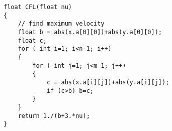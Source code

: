\documentclass[notitlepage]{article}
\begin{document}
\begin{lstlisting}[style=myCpp]
float CFL(float nu)
{
	// find maximum velocity
	float b = abs(x.a[0][0])+abs(y.a[0][0]);
	float c;
	for ( int i=1; i<n-1; i++)
	{
		for ( int j=1; j<m-1; j++)
		{ 
			c = abs(x.a[i][j])+abs(y.a[i][j]);
			if (c>b) b=c;
		}
	}
	return 1./(b+3.*nu);
}
\end{lstlisting}

\begin{comment}
\section{a}

\subsection{Description}

a

\subsection{Internal fields}

\begin{itemize}
\item \texttt{<float> b} - a
\end{itemize}

\subsection{Methods}

\subsubsection{a}

a
\end{comment}
\end{document}
